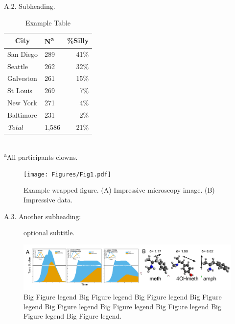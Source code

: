 \documentclass[11pt,notitlepage]{article}
\begin{document}
\begin{description}
\item[A.2. Subheading.]{}
\end{description}

\begin{table} %
\caption{Example Table}
\begin{center}
\begin{tabular}{l l r}
\toprule
\multicolumn{1}{c}{City} & {N\textsuperscript{a}} & {\%Silly}\\
\midrule
San Diego & 289 & 41\%\\
Seattle & 262 & 32\%\\
Galveston & 261 & 15\%\\
St Louis & 269 & 7\%\\
New York & 271 & 4\%\\
Baltimore & 231 & 2\%\\
\emph{Total} & 1,586 & 21\%\\
\hline
\end{tabular}\\
\footnotesize\textsuperscript{a}{All participants clowns.}
\end{center}
\label{default}
\end{table}

\lipsum[8-10]

\begin{figure} %
\texttt{[image: Figures/Fig1.pdf]}
\caption{\footnotesize Example wrapped figure. (A) Impressive microscopy image. (B) Impressive data.}
\end{figure}

\lipsum[5]

\begin{description}
\item[A.3. Another subheading:]{optional subtitle.}
\end{description}

\lipsum[25]

\begin{figure}[b c] %
\centering
\includegraphics[scale = .80]{Figures/Fig2.pdf}
\caption{\footnotesize Big Figure legend Big Figure legend Big Figure legend Big Figure legend Big Figure legend Big Figure legend Big Figure legend Big Figure legend Big Figure legend.}
\label{fig2}
\end{figure}
\end{document}
